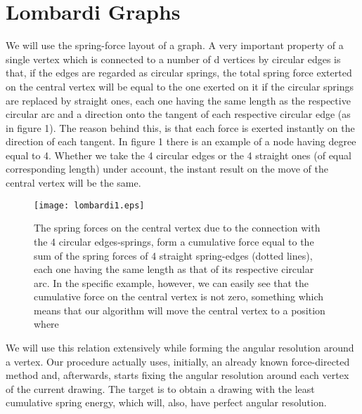 \documentclass[10pt]{article}
\begin{document}
\section{Lombardi Graphs}

We will use the spring-force layout of a graph. A very important property of a single vertex which is connected to a number of d vertices by circular edges is that, if the edges are regarded as circular springs, the total spring force exterted on the central vertex will be equal to the one exerted on it if the circular springs are replaced by straight ones, each one having the same length as the respective circular arc and a direction onto the tangent of each respective circular edge (as in figure 1). The reason behind this, is that each force is exerted instantly on the direction of each tangent. In figure 1 there is an example of a node having degree equal to 4. Whether we take the 4 circular edges or the 4 straight ones (of equal corresponding length) under account, the instant result on the move of the central vertex will be the same.

\begin{figure}
\begin{center}
\texttt{[image: lombardi1.eps]}
\caption{The spring forces on the central vertex due to the connection with the 4 circular edges-springs, form a cumulative force equal to the sum of the spring forces of 4 straight spring-edges (dotted lines), each one having the same length as that of its respective circular arc. In the specific example, however, we can easily see that the cumulative force on the central vertex is not zero, something which means that our algorithm will move the central vertex to a position where }
\end{center}
\end{figure}


We will use this relation extensively while forming the angular resolution around a vertex. Our procedure actually uses, initially, an already known force-directed method and, afterwards, starts fixing the angular resolution around each vertex of the current drawing. The target is to obtain a drawing with the least cumulative spring energy, which will, also, have perfect angular resolution.
\end{document}
